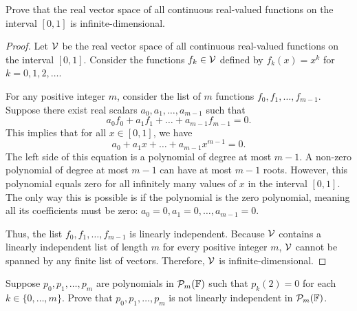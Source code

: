 \begin{question}
	Prove that the real vector space of all continuous real-valued functions on the interval $[0, 1]$ is infinite-dimensional.
\end{question}
\begin{proof}
	Let $\mathcal{V}$ be the real vector space of all continuous real-valued functions on the interval $[0, 1]$. Consider the functions $f_k \in \mathcal{V}$ defined by $f_k(x) = x^k$ for $k = 0, 1, 2, \dots$. 
	
	For any positive integer $m$, consider the list of $m$ functions $f_0, f_1, \dots, f_{m-1}$. Suppose there exist real scalars $a_0, a_1, \dots, a_{m-1}$ such that
	\[
	a_0 f_0 + a_1 f_1 + \dots + a_{m-1} f_{m-1} = 0.
	\]
	This implies that for all $x \in [0, 1]$, we have
	\[
	a_0 + a_1 x + \dots + a_{m-1} x^{m-1} = 0.
	\]
	The left side of this equation is a polynomial of degree at most $m-1$. A non-zero polynomial of degree at most $m-1$ can have at most $m-1$ roots. However, this polynomial equals zero for all infinitely many values of $x$ in the interval $[0, 1]$. The only way this is possible is if the polynomial is the zero polynomial, meaning all its coefficients must be zero: $a_0 = 0, a_1 = 0, \dots, a_{m-1} = 0$.
	
	Thus, the list $f_0, f_1, \dots, f_{m-1}$ is linearly independent. Because $\mathcal{V}$ contains a linearly independent list of length $m$ for every positive integer $m$, $\mathcal{V}$ cannot be spanned by any finite list of vectors. Therefore, $\mathcal{V}$ is infinite-dimensional.
\end{proof}
\begin{question}
	Suppose $p_0, p_1, \dots, p_m$ are polynomials in $\mathcal{P}_m(\mathbb{F})$ such that $p_k(2) = 0$ for each $k \in \{0, \dots, m\}$. Prove that $p_0, p_1, \dots, p_m$ is not linearly independent in $\mathcal{P}_m(\mathbb{F})$.
\end{question}
